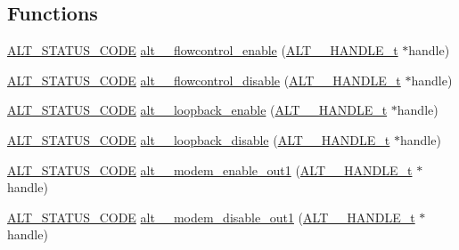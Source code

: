 \subsection*{Functions}
\begin{DoxyCompactItemize}
\item 
\mbox{\hyperlink{hwlib_8h_abdb0d369f069723ca55d6c94bcaaaa12}{A\+L\+T\+\_\+\+S\+T\+A\+T\+U\+S\+\_\+\+C\+O\+DE}} \mbox{\hyperlink{group__UART__MODEM_ga7a5333a00d5320027a8f91e36c1ae474}{alt\+\_\+\_\+flowcontrol\+\_\+enable}} (\mbox{\hyperlink{group__UART__BASIC_ga4173f362f19fc04032c3859b78d78119}{A\+L\+T\+\_\+\_\+\+H\+A\+N\+D\+L\+E\+\_\+t}} $\ast$handle)
\item 
\mbox{\hyperlink{hwlib_8h_abdb0d369f069723ca55d6c94bcaaaa12}{A\+L\+T\+\_\+\+S\+T\+A\+T\+U\+S\+\_\+\+C\+O\+DE}} \mbox{\hyperlink{group__UART__MODEM_ga338ac1d67e33dc4fb16d2b9ffd95f3e9}{alt\+\_\+\_\+flowcontrol\+\_\+disable}} (\mbox{\hyperlink{group__UART__BASIC_ga4173f362f19fc04032c3859b78d78119}{A\+L\+T\+\_\+\_\+\+H\+A\+N\+D\+L\+E\+\_\+t}} $\ast$handle)
\item 
\mbox{\hyperlink{hwlib_8h_abdb0d369f069723ca55d6c94bcaaaa12}{A\+L\+T\+\_\+\+S\+T\+A\+T\+U\+S\+\_\+\+C\+O\+DE}} \mbox{\hyperlink{group__UART__MODEM_gad4be88a6bd9ba8fd7e6b88e5fa492c50}{alt\+\_\+\_\+loopback\+\_\+enable}} (\mbox{\hyperlink{group__UART__BASIC_ga4173f362f19fc04032c3859b78d78119}{A\+L\+T\+\_\+\_\+\+H\+A\+N\+D\+L\+E\+\_\+t}} $\ast$handle)
\item 
\mbox{\hyperlink{hwlib_8h_abdb0d369f069723ca55d6c94bcaaaa12}{A\+L\+T\+\_\+\+S\+T\+A\+T\+U\+S\+\_\+\+C\+O\+DE}} \mbox{\hyperlink{group__UART__MODEM_ga2b4397bd5cf7d7b45537cb1c1609863c}{alt\+\_\+\_\+loopback\+\_\+disable}} (\mbox{\hyperlink{group__UART__BASIC_ga4173f362f19fc04032c3859b78d78119}{A\+L\+T\+\_\+\_\+\+H\+A\+N\+D\+L\+E\+\_\+t}} $\ast$handle)
\item 
\mbox{\hyperlink{hwlib_8h_abdb0d369f069723ca55d6c94bcaaaa12}{A\+L\+T\+\_\+\+S\+T\+A\+T\+U\+S\+\_\+\+C\+O\+DE}} \mbox{\hyperlink{group__UART__MODEM_ga3f5b29c0a1a86d78ab7cee4311ace623}{alt\+\_\+\_\+modem\+\_\+enable\+\_\+out1}} (\mbox{\hyperlink{group__UART__BASIC_ga4173f362f19fc04032c3859b78d78119}{A\+L\+T\+\_\+\_\+\+H\+A\+N\+D\+L\+E\+\_\+t}} $\ast$handle)
\item 
\mbox{\hyperlink{hwlib_8h_abdb0d369f069723ca55d6c94bcaaaa12}{A\+L\+T\+\_\+\+S\+T\+A\+T\+U\+S\+\_\+\+C\+O\+DE}} \mbox{\hyperlink{group__UART__MODEM_gaea6d905c2b046b300a45a8df51c73d02}{alt\+\_\+\_\+modem\+\_\+disable\+\_\+out1}} (\mbox{\hyperlink{group__UART__BASIC_ga4173f362f19fc04032c3859b78d78119}{A\+L\+T\+\_\+\_\+\+H\+A\+N\+D\+L\+E\+\_\+t}} $\ast$handle)

\end{DoxyCompactItemize}
